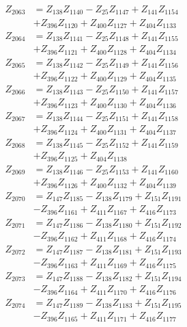 \begin{multicols}{2}
\begin{align}
Z_{2063} &= Z_{138}Z_{1140} - Z_{25}Z_{1147} + Z_{141}Z_{1154}  \nonumber \\
&+ Z_{396}Z_{1120} + Z_{400}Z_{1127} + Z_{404}Z_{1133} \nonumber \\
Z_{2064} &= Z_{138}Z_{1141} - Z_{25}Z_{1148} + Z_{141}Z_{1155}  \nonumber \\
&+ Z_{396}Z_{1121} + Z_{400}Z_{1128} + Z_{404}Z_{1134} \nonumber \\
Z_{2065} &= Z_{138}Z_{1142} - Z_{25}Z_{1149} + Z_{141}Z_{1156}  \nonumber \\
&+ Z_{396}Z_{1122} + Z_{400}Z_{1129} + Z_{404}Z_{1135} \nonumber \\
Z_{2066} &= Z_{138}Z_{1143} - Z_{25}Z_{1150} + Z_{141}Z_{1157}  \nonumber \\
&+ Z_{396}Z_{1123} + Z_{400}Z_{1130} + Z_{404}Z_{1136} \nonumber \\
Z_{2067} &= Z_{138}Z_{1144} - Z_{25}Z_{1151} + Z_{141}Z_{1158}  \nonumber \\
&+ Z_{396}Z_{1124} + Z_{400}Z_{1131} + Z_{404}Z_{1137} \nonumber \\
Z_{2068} &= Z_{138}Z_{1145} - Z_{25}Z_{1152} + Z_{141}Z_{1159}  \nonumber \\
&+ Z_{396}Z_{1125} + Z_{404}Z_{1138} \nonumber \\
Z_{2069} &= Z_{138}Z_{1146} - Z_{25}Z_{1153} + Z_{141}Z_{1160}  \nonumber \\
&+ Z_{396}Z_{1126} + Z_{400}Z_{1132} + Z_{404}Z_{1139} \nonumber \\
Z_{2070} &= Z_{147}Z_{1185} - Z_{138}Z_{1179} + Z_{151}Z_{1191}  \nonumber \\
&- Z_{396}Z_{1161} + Z_{411}Z_{1167} + Z_{416}Z_{1173} \nonumber \\
Z_{2071} &= Z_{147}Z_{1186} - Z_{138}Z_{1180} + Z_{151}Z_{1192}  \nonumber \\
&- Z_{396}Z_{1162} + Z_{411}Z_{1168} + Z_{416}Z_{1174} \nonumber \\
Z_{2072} &= Z_{147}Z_{1187} - Z_{138}Z_{1181} + Z_{151}Z_{1193}  \nonumber \\
&- Z_{396}Z_{1163} + Z_{411}Z_{1169} + Z_{416}Z_{1175} \nonumber \\
Z_{2073} &= Z_{147}Z_{1188} - Z_{138}Z_{1182} + Z_{151}Z_{1194}  \nonumber \\
&- Z_{396}Z_{1164} + Z_{411}Z_{1170} + Z_{416}Z_{1176} \nonumber \\
Z_{2074} &= Z_{147}Z_{1189} - Z_{138}Z_{1183} + Z_{151}Z_{1195}  \nonumber \\
&- Z_{396}Z_{1165} + Z_{411}Z_{1171} + Z_{416}Z_{1177} \nonumber \\

\end{align}
\end{multicols}
